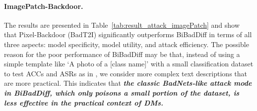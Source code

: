 \paragraph{ImagePatch-Backdoor.}
The results are presented in Table~\ref{tab:result_attack_imagePatch} and  show that Pixel-Backdoor (BadT2I) significantly outperforms BiBadDiff in terms of all three aspects: model specificity, model utility, and attack efficiency. 
The possible reason for the poor performance of BiBadDiff may be that, instead of using a simple template like ‘A photo of a [class name]’ with a small classification dataset to test ACCs and ASRs as in \cite{pan2024from}, we consider more complex text descriptions that are more practical.
This indicates that \textbf{\textit{the classic BadNets-like attack mode in BiBadDiff, which only poisons a small portion of the dataset, is less effective in the practical context of DMs.}} 

